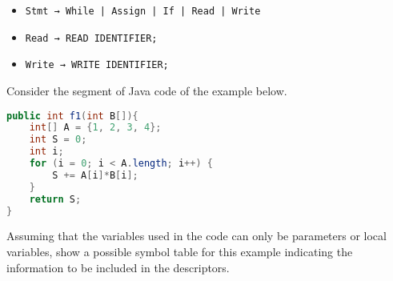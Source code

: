 \documentclass[docid=2017]{comp_test1}
\begin{document}
\begin{itemize}[wide, noitemsep]
    \item \texttt{Stmt → While | Assign | If | Read | Write}
    \item \texttt{Read → READ IDENTIFIER;}
    \item \texttt{Write → WRITE IDENTIFIER;}
\end{itemize}


Consider the segment of Java code of the example below.

\begin{lstlisting}[language=java]
public int f1(int B[]){
    int[] A = {1, 2, 3, 4};
    int S = 0;
    int i;
    for (i = 0; i < A.length; i++) {
        S += A[i]*B[i];
    }
    return S;
}
\end{lstlisting}

\question
Assuming that the variables used in the code can only be parameters or local variables, show a possible symbol table for this example indicating the information to be included in the descriptors.

\ansseparator
\end{document}
